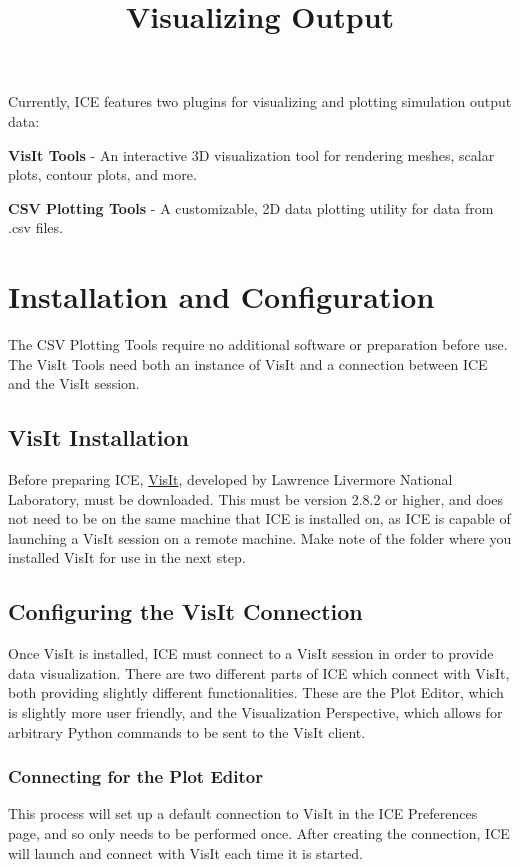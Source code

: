 \documentclass{article}
\begin{document}
\title{Visualizing Output}

Currently, ICE features two plugins for visualizing and plotting simulation
output data:

\textbf{VisIt Tools} - An interactive 3D visualization tool for rendering
meshes, scalar plots, contour plots, and more. 

\textbf{CSV Plotting Tools} - A customizable, 2D data plotting utility for data 
from .csv files.

\section{Installation and Configuration}

The CSV Plotting Tools require no additional software or preparation before use.
The VisIt Tools need both an instance of VisIt and a connection between ICE and
the VisIt session.

\subsection{VisIt Installation} 

Before preparing ICE,
\href{https://wci.llnl.gov/simulation/computer-codes/visit/}{VisIt}, developed
by Lawrence Livermore National Laboratory, must be downloaded. This must be
version 2.8.2 or higher, and does not need to be on the same machine that ICE is
installed on, as ICE is capable of launching a VisIt session on a remote machine. Make
note of the folder where you installed VisIt for use in the next step.

\subsection{Configuring the VisIt Connection}

Once VisIt is installed, ICE must connect to a VisIt session in order to provide
data visualization. There are two different parts of ICE which connect with
VisIt, both providing slightly different functionalities. These are the Plot
Editor, which is slightly more user friendly, and the Visualization Perspective,
which allows for arbitrary Python commands to be sent to the VisIt client. 

\subsubsection{Connecting for the Plot Editor} 

This process will set up a default connection to VisIt in the ICE Preferences
page, and so only needs to be performed once. After creating the connection, ICE
will launch and connect with VisIt each time it is started.
\end{document}
